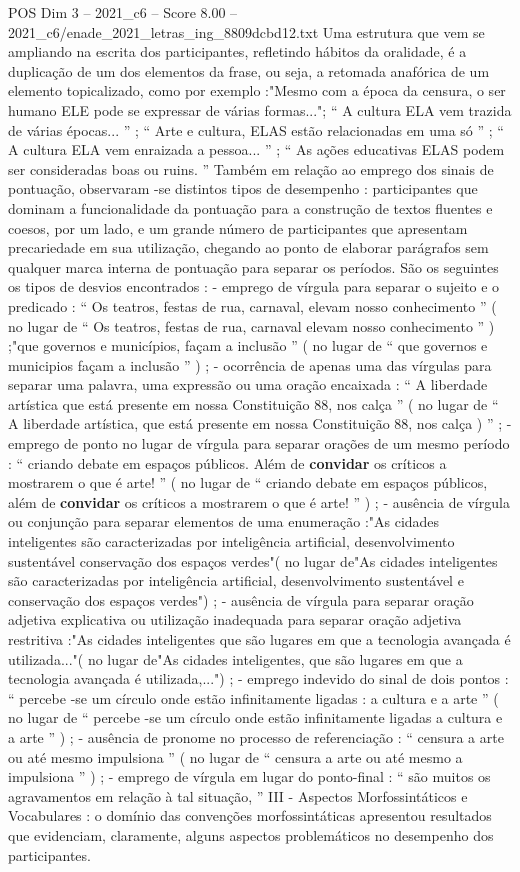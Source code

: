 \begin{textsample}{POS Dim 3 – 2021\_c6 – Score 8.00 – 2021\_c6/enade\_2021\_letras\_ing\_8809dcbd12.txt}
Uma estrutura que vem se ampliando na escrita dos participantes, refletindo hábitos da oralidade, é a duplicação de um dos elementos da frase, ou seja, a retomada anafórica de um elemento topicalizado, como por exemplo :"Mesmo com a época da censura, o ser humano ELE pode se expressar de várias formas..."; “ A cultura ELA vem trazida de várias épocas... ” ; “ Arte e cultura, ELAS estão relacionadas em uma só ” ; “ A cultura ELA vem enraizada a pessoa... ” ; “ As ações educativas ELAS podem ser consideradas boas ou ruins. ” Também em relação ao emprego dos sinais de pontuação, observaram -se distintos tipos de desempenho : participantes que dominam a funcionalidade da pontuação para a construção de textos fluentes e coesos, por um lado, e um grande número de participantes que apresentam precariedade em sua utilização, chegando ao ponto de elaborar parágrafos sem qualquer marca interna de pontuação para separar os períodos.
São os seguintes os tipos de desvios encontrados : - emprego de vírgula para separar o sujeito e o predicado : “ Os teatros, festas de rua, carnaval, elevam nosso conhecimento ” ( no lugar de “ Os teatros, festas de rua, carnaval elevam nosso conhecimento ” ) ;"que governos e municípios, façam a inclusão ” ( no lugar de “ que governos e municipios façam a inclusão ” ) ; - ocorrência de apenas uma das vírgulas para separar uma palavra, uma expressão ou uma oração encaixada : “ A liberdade artística que está presente em nossa Constituição 88, nos calça ” ( no lugar de “ A liberdade artística, que está presente em nossa Constituição 88, nos calça ) ” ; - emprego de ponto no lugar de vírgula para separar orações de um mesmo período : “ criando debate em espaços públicos.
Além de \textbf{convidar} os críticos a mostrarem o que é arte! ” ( no lugar de “ criando debate em espaços públicos, além de \textbf{convidar} os críticos a mostrarem o que é arte! ” ) ; - ausência de vírgula ou conjunção para separar elementos de uma enumeração :"As cidades inteligentes são caracterizadas por inteligência artificial, desenvolvimento sustentável conservação dos espaços verdes"( no lugar de"As cidades inteligentes são caracterizadas por inteligência artificial, desenvolvimento sustentável e conservação dos espaços verdes") ; - ausência de vírgula para separar oração adjetiva explicativa ou utilização inadequada para separar oração adjetiva restritiva :"As cidades inteligentes que são lugares em que a tecnologia avançada é utilizada..."( no lugar de"As cidades inteligentes, que são lugares em que a tecnologia avançada é utilizada,...") ; - emprego indevido do sinal de dois pontos : “ percebe -se um círculo onde estão infinitamente ligadas : a cultura e a arte ” ( no lugar de “ percebe -se um círculo onde estão infinitamente ligadas a cultura e a arte ” ) ; - ausência de pronome no processo de referenciação : “ censura a arte ou até mesmo impulsiona ” ( no lugar de “ censura a arte ou até mesmo a impulsiona ” ) ; - emprego de vírgula em lugar do ponto-final : “ são muitos os agravamentos em relação à tal situação, ” III - Aspectos Morfossintáticos e Vocabulares : o domínio das convenções morfossintáticas apresentou resultados que evidenciam, claramente, alguns aspectos problemáticos no desempenho dos participantes.

\end{textsample}

